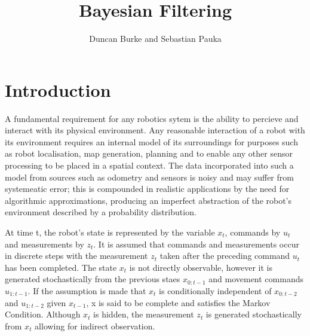 \documentclass[english]{article}
\begin{document}
\title{Bayesian Filtering}

\author{Duncan Burke and Sebastian Pauka}
\maketitle


\section*{Introduction}


A fundamental requirement for any robotics sytem is the ability to percieve and interact with its physical environment. Any reasonable interaction of a robot with its environment requires an internal model of its surroundings for purposes such as robot localisation, map generation, planning and to enable any other sensor processing to be placed in a spatial context. The data incorporated into such a model from sources such as odometry and sensors is noisy and may suffer from systemeatic error; this is compounded in realistic applications by the need for algorithmic approximations, producing an imperfect abstraction of the robot's environment described by a probability distribution.


At time t, the robot's state is represented by the variable $x_t$, commands by $u_t$ and measurements by $z_t$. It is assumed that commands and measurements occur in discrete steps with the measurement $z_t$ taken after the preceding command $u_t$ has been completed. The state $x_t$ is not directly observable, however it is generated stochastically from the previous staes $x_{0:t-1}$ and movement commands $u_{1:t-1}$. If the assumption is made that $x_t$ is conditionally independent of $x_{0:t-2}$ and $u_{1:t-2}$ given $x_{t-1}$, x is said to be complete and satisfies the Markov Condition. Although $x_t$ is hidden, the measurement $z_t$ is generated stochastically from $x_t$ allowing for indirect observation.
\end{document}
